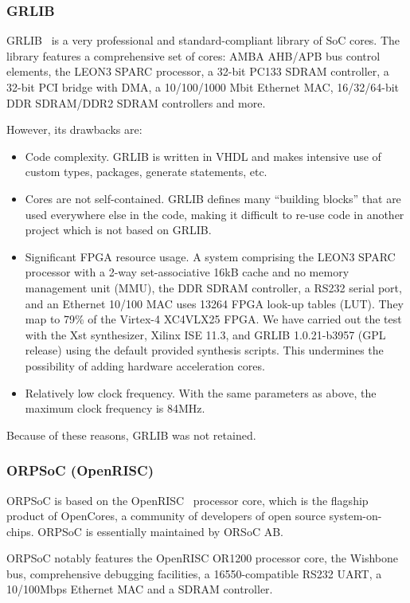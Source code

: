 \documentclass[a4paper,11pt]{kthesis}
\begin{document}
\subsubsection{GRLIB}
GRLIB~\cite{grlib} is a very professional and standard-compliant library of SoC cores. The library features a comprehensive set of cores: AMBA AHB/APB bus control elements, the LEON3 SPARC processor, a 32-bit PC133 SDRAM controller, a 32-bit PCI bridge with DMA, a 10/100/1000 Mbit Ethernet MAC,  16/32/64-bit DDR SDRAM/DDR2 SDRAM controllers and more.

However, its drawbacks are:
\begin{itemize}
\item Code complexity. GRLIB is written in VHDL and makes intensive use of custom types, packages, generate statements, etc.
\item Cores are not self-contained. GRLIB defines many ``building blocks'' that are used everywhere else in the code, making it difficult to re-use code in another project which is not based on GRLIB.
\item Significant FPGA resource usage. A system comprising the LEON3 SPARC processor with a 2-way set-associative 16kB cache and no memory management unit (MMU), the DDR SDRAM controller, a RS232 serial port, and an Ethernet 10/100 MAC uses 13264 FPGA look-up tables (LUT). They map to 79\% of the Virtex-4 XC4VLX25 FPGA. We have carried out the test with the Xst synthesizer, Xilinx ISE 11.3, and GRLIB 1.0.21-b3957 (GPL release) using the default provided synthesis scripts. This undermines the possibility of adding hardware acceleration cores.
\item Relatively low clock frequency. With the same parameters as above, the maximum clock frequency is 84MHz.
\end{itemize}

Because of these reasons, GRLIB was not retained.

\subsubsection{ORPSoC (OpenRISC)}
ORPSoC is based on the OpenRISC~\cite{openrisc} processor core, which is the flagship product of OpenCores, a community of developers of open source system-on-chips. ORPSoC is essentially maintained by ORSoC AB.

ORPSoC notably features the OpenRISC OR1200 processor core, the Wishbone~\cite{wishbone} bus, comprehensive debugging facilities, a 16550-compatible RS232 UART, a 10/100Mbps Ethernet MAC and a SDRAM controller.
\end{document}
